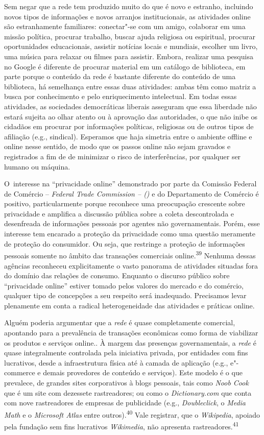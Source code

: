 Sem negar que a rede tem produzido muito do que é novo e estranho,
incluindo novos tipos de informações e novos arranjos institucionais, as
atividades online são estranhamente familiares: conectar"-se com um
amigo, colaborar em uma missão política, procurar trabalho, buscar ajuda
religiosa ou espiritual, procurar oportunidades educacionais, assistir
notícias locais e mundiais, escolher um livro, uma música para relaxar
ou filmes para assistir. Embora, realizar uma pesquisa no Google é
diferente de procurar material em um catálogo de biblioteca, em parte
porque o conteúdo da rede é bastante diferente do conteúdo de uma
biblioteca, há semelhança entre essas duas atividades: ambas têm como
matriz a busca por conhecimento e pelo enriquecimento intelectual. Em
todas essas atividades, as sociedades democráticas liberais asseguram
que essa liberdade não estará sujeita ao olhar atento ou à aprovação das
autoridades, o que não inibe os cidadãos em procurar por informações
políticas, religiosas ou de outros tipos de afiliação (e.g., sindical).
Esperamos que haja simetria entre o ambiente offline e online nesse
sentido, de modo que os passos online não sejam gravados e registrados a
fim de de minimizar o risco de interferências, por qualquer ser humano
ou máquina.

O~interesse na ``privacidade online'' demonstrado por parte da Comissão
Federal de Comércio -- \emph{Federal Trade Commission -- ()} e do
Departamento de Comércio é positivo, particularmente porque reconhece
uma preocupação crescente sobre privacidade e amplifica a discussão
pública sobre a coleta descontrolada e desenfreada de informações
pessoais por agentes não governamentais. Porém, esse interesse tem
encarado a proteção da privacidade como uma questão meramente de
proteção do consumidor. Ou seja, que restringe a proteção de informações
pessoais somente no âmbito das transações comerciais
online.\textsuperscript{{39}} Nenhuma dessas agências reconheceu
explicitamente o vasto panorama de atividades situadas fora do domínio
das relações de consumo. Enquanto o discurso público sobre ``privacidade
online'' estiver tomado pelos valores do mercado e do comércio, qualquer
tipo de concepções a seu respeito será inadequado. Precisamos levar
plenamente em conta a radical heterogeneidade das atividades e práticas
online.

Alguém poderia argumentar que a \emph{rede} é quase completamente
comercial, apontando para a prevalência de transações econômicas como
forma de viabilizar os produtos e serviços online.. À margem das
presenças governamentais, a \emph{rede} é quase integralmente controlada
pela iniciativa privada, por entidades com fins lucrativos, desde a
infraestrutura física até à camada de aplicação (e.g., e"-commerce e
demais provedores de conteúdo e serviços). Este modelo é o que
prevalece, de grandes sites corporativos à blogs pessoais, tais como
\emph{Noob Cook} que é um site com dezessete rastreadores; ou como o
\emph{Dictionary.com} que conta com nove rastreadores de empresas de
publicidade (e.g., \emph{Doubleclick}, o \emph{Media Math} e o
\emph{Microsoft Atlas} entre outros).\textsuperscript{{40}} Vale
registrar, que o \emph{Wikipedia}, apoiado pela fundação sem fins
lucrativos \emph{Wikimedia}, não apresenta
rastreadores.\textsuperscript{{41}}

